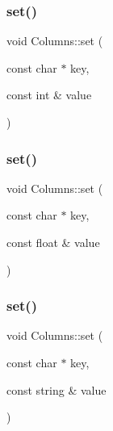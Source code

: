 \mbox{\label{classColumns_a878cae2a1f8d3ee9e3b3f8dfae5a4a10}} 
\subsubsection{\texorpdfstring{set()}{set()}\hspace{0.1cm}{\footnotesize\ttfamily [1/4]}}
{\footnotesize\ttfamily void Columns\+::set (\begin{DoxyParamCaption}\item[{const char $\ast$}]{key,  }\item[{const int \&}]{value }\end{DoxyParamCaption})}

\mbox{\label{classColumns_a2c67a52aadc3501d509ff03a4990cada}} 
\subsubsection{\texorpdfstring{set()}{set()}\hspace{0.1cm}{\footnotesize\ttfamily [2/4]}}
{\footnotesize\ttfamily void Columns\+::set (\begin{DoxyParamCaption}\item[{const char $\ast$}]{key,  }\item[{const float \&}]{value }\end{DoxyParamCaption})}

\mbox{\label{classColumns_a1c0dc9986943b8152fa80dd53277fbd0}} 
\subsubsection{\texorpdfstring{set()}{set()}\hspace{0.1cm}{\footnotesize\ttfamily [3/4]}}
{\footnotesize\ttfamily void Columns\+::set (\begin{DoxyParamCaption}\item[{const char $\ast$}]{key,  }\item[{const string \&}]{value }\end{DoxyParamCaption})}

\mbox{\label{classColumns_a5eb2a1336790ed61ff1593561ebf6736}} 
